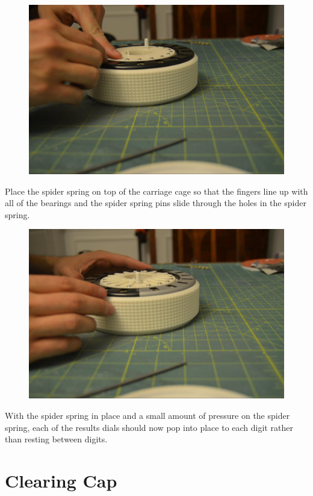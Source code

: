 \documentclass[openany]{book}
\begin{document}
\begin{figure}[!ht]
	\centering
	\includegraphics[width=.75\textwidth]{images/image30.jpg}
	\caption{}
	\label{fig:image30}	
\end{figure}


Place the spider spring on top of the carriage cage so that the fingers line up with all of the bearings and the spider spring pins slide through the holes in the spider spring.


\begin{figure}[!ht]
	\centering
	\includegraphics[width=.75\textwidth]{images/image39.jpg}
	\caption{}
	\label{fig:image39}	
\end{figure}


With the spider spring in place and a small amount of pressure on the spider spring, each of the results dials should now pop into place to each digit rather than resting between digits.



\chapter{Clearing Cap}
\end{document}
